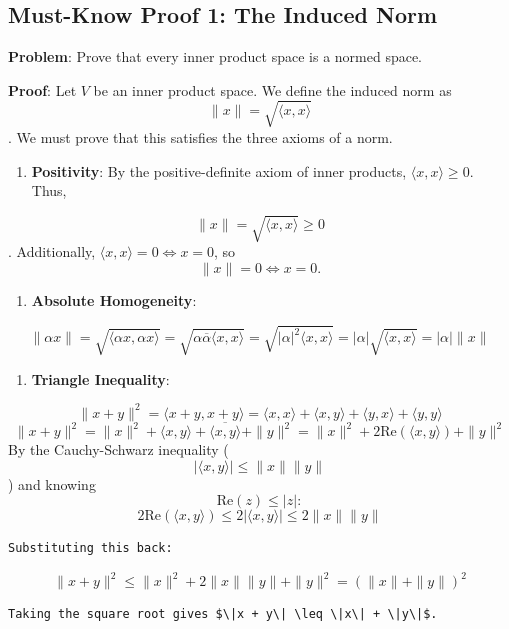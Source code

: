 \documentclass[
]{article}
\providecommand{\tightlist}{%
  \setlength{\itemsep}{0pt}\setlength{\parskip}{0pt}}
\begin{document}
\subsection{Must-Know Proof 1: The Induced
Norm}\label{must-know-proof-1-the-induced-norm}

\textbf{Problem}: Prove that every inner product space is a normed
space.

\textbf{Proof}: Let \(V\) be an inner product space. We define the
induced norm as
\[
\|x\| = \sqrt{\langle x, x \rangle}
\]
. We must prove that this satisfies the three axioms of a norm.

\begin{enumerate}
\def\labelenumi{\arabic{enumi}.}
\tightlist
\item
  \textbf{Positivity}: By the positive-definite axiom of inner products,
  \(\langle x, x \rangle \geq 0\). Thus,
\end{enumerate}
\[
\|x\| = \sqrt{\langle x, x \rangle} \geq 0
\]
. Additionally, \(\langle x, x \rangle = 0 \iff x = 0\), so
\[
\|x\| = 0 \iff x = 0.
\]
\begin{enumerate}
\def\labelenumi{\arabic{enumi}.}
\setcounter{enumi}{1}
\tightlist
\item
  \textbf{Absolute Homogeneity}:
\end{enumerate}
\[
\|\alpha x\| = \sqrt{\langle \alpha x, \alpha x \rangle} = \sqrt{\alpha \overline{\alpha} \langle x, x \rangle} = \sqrt{\lvert \alpha \rvert^2 \langle x, x \rangle} = \lvert \alpha \rvert \sqrt{\langle x, x \rangle} = \lvert \alpha \rvert \|x\|
\]
\begin{enumerate}
\def\labelenumi{\arabic{enumi}.}
\setcounter{enumi}{2}
\tightlist
\item
  \textbf{Triangle Inequality}:
\end{enumerate}
\[
\|x + y\|^2 = \langle x + y, x + y \rangle = \langle x, x \rangle + \langle x, y \rangle + \langle y, x \rangle + \langle y, y \rangle
\]
\[
\|x + y\|^2 = \|x\|^2 + \langle x, y \rangle + \overline{\langle x, y \rangle} + \|y\|^2 = \|x\|^2 + 2\text{Re}(\langle x, y \rangle) + \|y\|^2
\]
By the Cauchy-Schwarz inequality (
\[
\lvert \langle x, y \rangle \rvert \leq \|x\| \|y\|
\]
) and knowing
\[
\text{Re}(z) \leq \lvert z \rvert:
\]
\[
2\text{Re}(\langle x, y \rangle) \leq 2\lvert \langle x, y \rangle \rvert \leq 2\|x\|\|y\|
\]
\begin{verbatim}
Substituting this back:
\end{verbatim}
\[
\|x + y\|^2 \leq \|x\|^2 + 2\|x\|\|y\| + \|y\|^2 = (\|x\| + \|y\|)^2
\]
\begin{verbatim}
Taking the square root gives $\|x + y\| \leq \|x\| + \|y\|$.
\end{verbatim}
\end{document}
